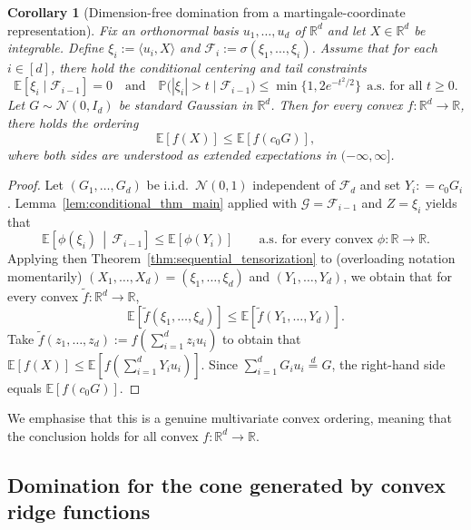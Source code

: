 \documentclass[11pt]{article}
\newcommand{\R}{\mathbb{R}}
\newcommand{\Pbb}{\mathbb{P}}
\newcommand{\Ebb}{\mathbb{E}}
\newcommand{\cN}{\mathcal{N}}
\newtheorem{corollary}[theorem]{Corollary}
\begin{document}
\begin{corollary}[Dimension-free domination from a martingale-coordinate representation]
\label{cor:martingale_basis}
Fix an orthonormal basis $u_1, \dots, u_d$ of $\R^d$ and let $X \in \R^d$ be integrable.
Define $\xi_i := \langle u_i, X \rangle$ and $\mathcal F_i := \sigma (\xi_1, \dots, \xi_i)$.
Assume that for each $i\in[d]$, there hold the conditional centering and  tail constraints
%
\[
\Ebb [ \xi_i \mid \mathcal F_{i-1}] = 0
\quad \text{and} \quad
\Pbb \big(|\xi_i| > t \mid \mathcal F_{i-1} \big) \le \min \{ 1,  2e^{-t^2/2} \}
\ \ \text{a.s. for all } t \ge 0.
\]
%
Let $G \sim \cN (0, I_d)$ be standard Gaussian in $\R^d$.
Then for every convex $f : \R^d \to \R$, there holds the ordering
%
\[
\Ebb [f (X)] \le \Ebb[f (c_0G)],
\]
%
where both sides are understood as extended expectations in $(-\infty, \infty]$.
\end{corollary}

\begin{proof}
Let $(G_1, \dots, G_d)$ be i.i.d.\ $\cN (0,1)$ independent of $\mathcal F_d$ and set $Y_i: = c_0 G_i$.
Lemma~\ref{lem:conditional_thm_main} applied with $\mathcal G = \mathcal F_{i-1}$ and $Z = \xi_i$ yields that
%
\[
\Ebb\! \left[ \phi (\xi_i) \, \middle| \, \mathcal F_{i-1} \right] \le \Ebb[\phi (Y_i)]
\qquad \text{a.s. for every convex } \phi : \R \to \R.
\]
%
Applying then Theorem~\ref{thm:sequential_tensorization} to (overloading notation momentarily) $(X_1, \dots, X_d) = (\xi_1, \dots, \xi_d)$ and $(Y_1, \dots, Y_d)$, we obtain that for every convex $\widetilde f : \R^d \to \R$,
%
\[
\Ebb[\widetilde f( \xi_1, \dots, \xi_d)] \le \Ebb[\widetilde f (Y_1, \dots, Y_d)].
\]
%
Take $\widetilde f (z_1, \dots, z_d) := f(\sum_{i=1}^d z_i u_i)$ to obtain that
$\Ebb [f (X)] \le \Ebb[f (\sum_{i=1}^d Y_i u_i)]$.
Since $\sum_{i=1}^d G_i u_i\stackrel{d}{=}G$, the right-hand side equals $\Ebb[f(c_0G)]$.
\end{proof}

We emphasise that this is a genuine multivariate convex ordering, meaning that the conclusion holds for all convex $f : \R^d \to \R$.

\subsection*{Domination for the cone generated by convex ridge functions}
\end{document}
